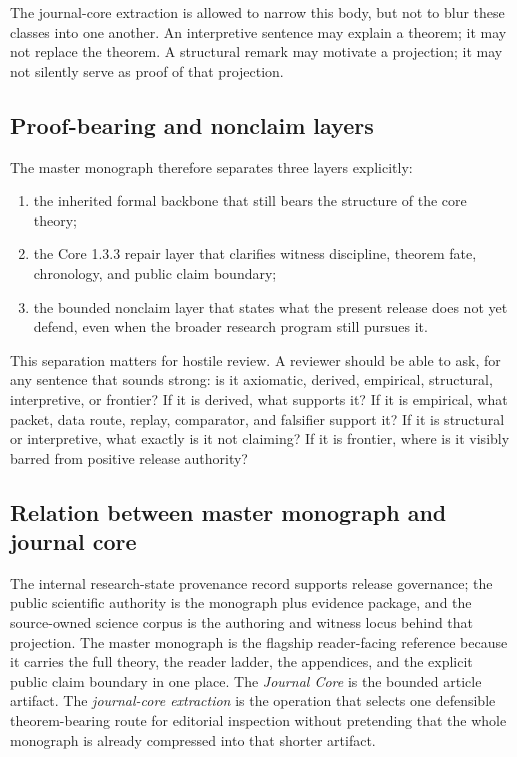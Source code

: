 The journal-core extraction is allowed to narrow this body, but not to blur
these classes into one another.
An interpretive sentence may explain a theorem; it may not replace the theorem.
A structural remark may motivate a projection; it may not silently serve as
proof of that projection.

\subsection{Proof-bearing and nonclaim layers}

The master monograph therefore separates three layers explicitly:

\begin{enumerate}
\item the inherited formal backbone that still bears the structure of the core
      theory;
\item the Core 1.3.3 repair layer that clarifies witness discipline, theorem
      fate, chronology, and public claim boundary;
\item the bounded nonclaim layer that states what the present release does not
      yet defend, even when the broader research program still pursues it.
\end{enumerate}

This separation matters for hostile review.
A reviewer should be able to ask, for any sentence that sounds strong:
is it axiomatic, derived, empirical, structural, interpretive, or frontier?
If it is derived, what supports it?
If it is empirical, what packet, data route, replay, comparator, and falsifier
support it?
If it is structural or interpretive, what exactly is it not claiming?
If it is frontier, where is it visibly barred from positive release authority?

\subsection{Relation between master monograph and journal core}

The internal research-state provenance record supports release governance; the public scientific authority is the monograph plus evidence package, and the
source-owned science corpus is the authoring and witness locus behind that
projection. The master monograph is the flagship reader-facing reference
because it carries the full theory, the reader ladder, the appendices, and the
explicit public claim boundary in one place.
The \emph{Journal Core} is the bounded article artifact. The
\emph{journal-core extraction} is the operation that selects one defensible
theorem-bearing route for editorial inspection without pretending that the
whole monograph is already compressed into that shorter artifact.

